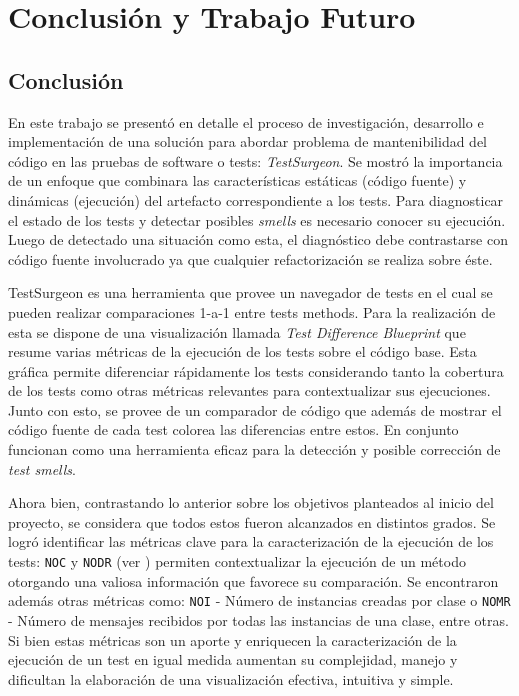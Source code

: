 \chapter{Conclusión y Trabajo Futuro}

\section{Conclusión}

\par En este trabajo se presentó en detalle el proceso de investigación, desarrollo e implementación de una solución para abordar problema de mantenibilidad del código en las pruebas de software o tests: \emph{TestSurgeon}. Se mostró la importancia de un enfoque que combinara las características estáticas (código fuente) y dinámicas (ejecución) del artefacto correspondiente a los tests. Para diagnosticar el estado de los tests y detectar posibles \emph{smells} es necesario conocer su ejecución. Luego de detectado una situación como esta, el diagnóstico debe contrastarse con código fuente involucrado ya que cualquier refactorización se realiza sobre éste.

\par TestSurgeon es una herramienta que provee un navegador de tests en el cual se pueden realizar comparaciones 1-a-1 entre tests methods. Para la realización de esta se dispone de una visualización llamada \emph{Test Difference Blueprint} que resume varias métricas de la ejecución de los tests sobre el código base. Esta gráfica permite diferenciar rápidamente los tests considerando tanto la cobertura de los tests como otras métricas relevantes para contextualizar sus ejecuciones. Junto con esto, se provee de un comparador de código que además de mostrar el código fuente de cada test colorea las diferencias entre estos. En conjunto funcionan como una herramienta eficaz para la detección y posible corrección de \emph{test smells}.


\par Ahora bien, contrastando lo anterior sobre los objetivos planteados al inicio del proyecto, se considera que todos estos fueron alcanzados en distintos grados. Se logró identificar las métricas clave para la caracterización de la ejecución de los tests: {\tt NOC} y {\tt NODR} (ver ) permiten contextualizar la ejecución de un método otorgando una valiosa información que favorece su comparación. Se encontraron además otras métricas como: {\tt NOI} - Número de instancias creadas por clase o {\tt NOMR} - Número de mensajes recibidos por todas las instancias de una clase, entre otras. Si bien estas métricas son un aporte y enriquecen la caracterización de la ejecución de un test en igual medida aumentan su complejidad, manejo y dificultan la elaboración de una visualización efectiva, intuitiva y simple. 

